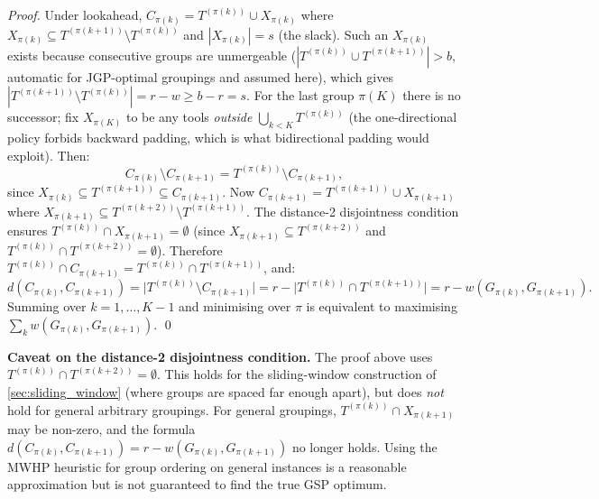 \documentclass[11pt,a4paper]{article}
\theoremstyle{plain}
\theoremstyle{definition}
\begin{document}
\begin{proofbox}
\begin{proof}
Under lookahead, $C_{\pi(k)} = T^{(\pi(k))} \cup X_{\pi(k)}$ where
$X_{\pi(k)} \subseteq T^{(\pi(k+1))} \setminus T^{(\pi(k))}$ and
$|X_{\pi(k)}| = s$ (the slack).
Such an $X_{\pi(k)}$ exists because consecutive groups are unmergeable
($|T^{(\pi(k))}\cup T^{(\pi(k+1))}|>b$, automatic for JGP-optimal groupings and
assumed here), which gives
$|T^{(\pi(k+1))}\setminus T^{(\pi(k))}|=r-w\ge b-r=s$. For the last group
$\pi(K)$ there is no successor; fix $X_{\pi(K)}$ to be any tools \emph{outside}
$\bigcup_{k<K}T^{(\pi(k))}$ (the one-directional policy forbids backward
padding, which is what bidirectional padding would exploit). Then:
\[
  C_{\pi(k)} \setminus C_{\pi(k+1)}
  = T^{(\pi(k))} \setminus C_{\pi(k+1)},
\]
since $X_{\pi(k)} \subseteq T^{(\pi(k+1))} \subseteq C_{\pi(k+1)}$.
Now $C_{\pi(k+1)} = T^{(\pi(k+1))} \cup X_{\pi(k+1)}$ where
$X_{\pi(k+1)} \subseteq T^{(\pi(k+2))} \setminus T^{(\pi(k+1))}$.
The distance-2 disjointness condition ensures $T^{(\pi(k))} \cap X_{\pi(k+1)} = \emptyset$
(since $X_{\pi(k+1)} \subseteq T^{(\pi(k+2))}$ and $T^{(\pi(k))} \cap T^{(\pi(k+2))}=\emptyset$).
Therefore $T^{(\pi(k))} \cap C_{\pi(k+1)} = T^{(\pi(k))} \cap T^{(\pi(k+1))}$, and:
\[
  d\!\left(C_{\pi(k)}, C_{\pi(k+1)}\right)
  = \bigl|T^{(\pi(k))} \setminus C_{\pi(k+1)}\bigr|
  = r - \bigl|T^{(\pi(k))} \cap T^{(\pi(k+1))}\bigr|
  = r - w\!\left(G_{\pi(k)}, G_{\pi(k+1)}\right).
\]
Summing over $k=1,\ldots,K-1$ and minimising over $\pi$ is equivalent to
maximising $\sum_k w(G_{\pi(k)}, G_{\pi(k+1)})$. \qed
\end{proof}
\end{proofbox}

\begin{warnbox}
\textbf{Caveat on the distance-2 disjointness condition.}
The proof above uses $T^{(\pi(k))} \cap T^{(\pi(k+2))} = \emptyset$.
This holds for the sliding-window construction of
\cref{sec:sliding_window} (where groups are spaced far enough apart),
but does \emph{not} hold for general arbitrary groupings.
For general groupings, $T^{(\pi(k))} \cap X_{\pi(k+1)}$ may be non-zero,
and the formula $d(C_{\pi(k)}, C_{\pi(k+1)}) = r - w(G_{\pi(k)},G_{\pi(k+1)})$
no longer holds.
Using the MWHP heuristic for group ordering on general instances is a
reasonable approximation but is not guaranteed to find the true GSP optimum.
\end{warnbox}
\end{document}
